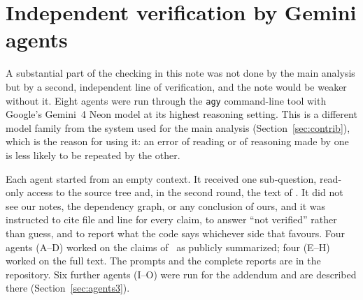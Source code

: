 \section{Independent verification by Gemini agents}
\label{sec:agents}

A substantial part of the checking in this note was not done by the main analysis but by a second, independent line of verification, and the note would be weaker without it.
Eight agents were run through the \texttt{agy} command-line tool with Google's Gemini~4 Neon model at its highest reasoning setting.
This is a different model family from the system used for the main analysis (Section~\ref{sec:contrib}), which is the reason for using it: an error of reading or of reasoning made by one is less likely to be repeated by the other.

Each agent started from an empty context. It received one sub-question, read-only access to the source tree and, in the second round, the text of \N.
It did not see our notes, the dependency graph, or any conclusion of ours, and it was instructed to cite file and line for every claim, to answer ``not verified'' rather than guess, and to report what the code says whichever side that favours.
Four agents (A--D) worked on the claims of \N\ as publicly summarized; four (E--H) worked on the full text. The prompts and the complete reports are in the repository.
Six further agents (I--O) were run for the addendum and are described there (Section~\ref{sec:agents3}).

